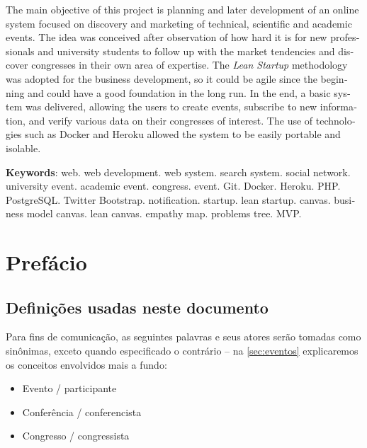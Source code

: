 \documentclass[12pt,a4paper,twoside,hyphens,english,brazil]{abntex2}
\begin{document}
\begin{otherlanguage}{english}
	\begin{resumo}[Abstract]
		The main objective of this project is planning and later development of an online system focused on discovery and marketing of technical, scientific and academic events. The idea was conceived after observation of how hard it is for new professionals and university students to follow up with the market tendencies and discover congresses in their own area of expertise. The \emph{Lean Startup} methodology was adopted for the business development, so it could be agile since the beginning and could have a good foundation in the long run. In the end, a basic system was delivered, allowing the users to create events, subscribe to new information, and verify various data on their congresses of interest. The use of technologies such as Docker and Heroku allowed the system to be easily portable and isolable.
		
		\vspace{\onelineskip}
		\textbf{Keywords}: web. web development. web system. search system. social network. university event. academic event. congress. event. Git. Docker. Heroku. PHP. PostgreSQL. Twitter Bootstrap. notification. startup. lean startup. canvas. business model canvas. lean canvas. empathy map. problems tree. MVP.
	\end{resumo}
\end{otherlanguage}

\tableofcontents*

\chapter*{Prefácio}
\section*{Definições usadas neste documento}
Para fins de comunicação, as seguintes palavras e seus atores serão tomadas como sinônimas, exceto quando especificado o contrário -- na \autoref{sec:eventos} explicaremos os conceitos envolvidos mais a fundo:
\begin{itemize}[itemsep=-1ex]
	\item Evento / participante
	\item Conferência / conferencista
	\item Congresso / congressista
\end{itemize}

\end{document}
